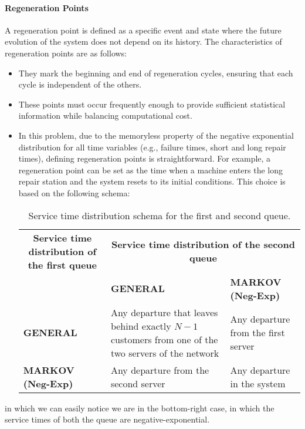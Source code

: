 \documentclass[12pt]{article}
\begin{document}
	\paragraph{Regeneration Points}
	A regeneration point is defined as a specific event and state where the future evolution of the system does not depend on its history. The characteristics of regeneration points are as follows:
	\begin{itemize}
		\item They mark the beginning and end of regeneration cycles, ensuring that each cycle is independent of the others.
		\item These points must occur frequently enough to provide sufficient statistical information while balancing computational cost.
		\item In this problem, due to the memoryless property of the negative exponential distribution for all time variables (e.g., failure times, short and long repair times), defining regeneration points is straightforward. For example, a regeneration point can be set as the time when a machine enters the long repair station and the system resets to its initial conditions. This choice is based on the following schema:
		
		\begin{table}[h!]
			\centering
			\renewcommand{\arraystretch}{1.5}
			\begin{tabular}{|m{4cm}|m{4cm}|m{4cm}|}
				\hline
				\multicolumn{1}{|c|}{\textbf{Service time distribution of the first queue}} &
				\multicolumn{2}{c|}{\textbf{Service time distribution of the second queue}} \\ 
				\cline{2-3}
				& \textbf{GENERAL} & \textbf{MARKOV (Neg-Exp)} \\ 
				\hline
				\textbf{GENERAL} & Any departure that leaves behind exactly $N - 1$ customers from one of the two servers of the network & Any departure from the first server \\ 
				\hline
				\textbf{MARKOV (Neg-Exp)} & Any departure from the second server & Any departure in the system \\ 
				\hline
			\end{tabular}
			\caption{Service time distribution schema for the first and second queue.}
		\end{table}
		
		
	\end{itemize}
	in which we can easily notice we are in the bottom-right case, in which the service times of both the queue are negative-exponential.
	
\end{document}
